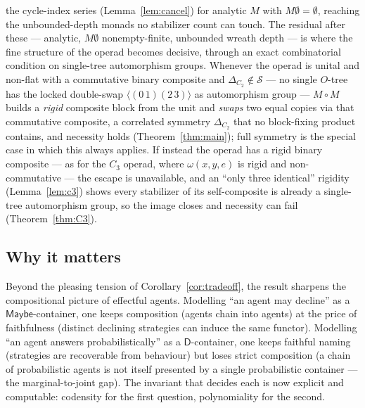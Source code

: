 \documentclass[11pt]{amsart}
\theoremstyle{plain}
\theoremstyle{definition}
\newcommand{\D}{\mathsf{D}}
\newcommand{\Maybe}{\mathsf{Maybe}}
\begin{document}
the cycle-index series (Lemma~\ref{lem:cancel}) for analytic $M$ with $M\emptyset=\emptyset$, reaching
the unbounded-depth monads no stabilizer count can touch. The residual after these --- analytic,
$M\emptyset$ nonempty-finite, unbounded wreath depth --- is where the fine structure of the operad becomes
decisive, through an exact combinatorial condition on single-tree automorphism groups. Whenever the operad
is unital and non-flat with a commutative binary composite and $\Delta_{C_2}\notin\mathcal S$ --- no
single $O$-tree has the locked double-swap $\langle(0\,1)(2\,3)\rangle$ as automorphism group --- $M\circ
M$ builds a \emph{rigid} composite block from the unit and \emph{swaps} two equal copies via that
commutative composite, a
correlated symmetry $\Delta_{C_2}$ that no block-fixing product contains, and necessity holds
(Theorem~\ref{thm:main}); full symmetry is the special case in which this always applies. If instead the
operad has a rigid binary composite --- as for the $C_3$ operad, where $\omega(x,y,e)$ is rigid and
non-commutative --- the escape is unavailable, and an ``only three identical'' rigidity
(Lemma~\ref{lem:c3}) shows every stabilizer of its self-composite is already a single-tree automorphism
group, so the image closes and necessity can fail (Theorem~\ref{thm:C3}).

\subsection*{Why it matters}
Beyond the pleasing tension of Corollary~\ref{cor:tradeoff}, the result sharpens the compositional
picture of effectful agents. Modelling ``an agent may decline'' as a $\Maybe$-container, one keeps
composition (agents chain into agents) at the price of faithfulness (distinct declining strategies
can induce the same functor). Modelling ``an agent answers probabilistically'' as a
$\D$-container, one keeps faithful naming (strategies are recoverable from behaviour) but loses
strict composition (a chain of probabilistic agents is not itself presented by a single
probabilistic container --- the marginal-to-joint gap). The invariant that decides each is now
explicit and computable: codensity for the first question, polynomiality for the second.
\end{document}
